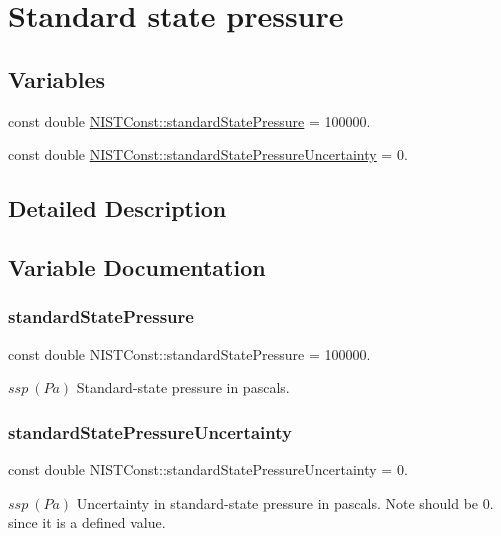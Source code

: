 \hypertarget{group___standard_state_pressure}{}\section{Standard state pressure}
\label{group___standard_state_pressure}
\subsection*{Variables}
\begin{DoxyCompactItemize}
\item 
const double \hyperlink{group___standard_state_pressure_gaede4b63db291cd6a839180595c7a191d}{N\+I\+S\+T\+Const\+::standard\+State\+Pressure} = 100000.
\item 
const double \hyperlink{group___standard_state_pressure_gad09c32ae21271794dece1e639699e96a}{N\+I\+S\+T\+Const\+::standard\+State\+Pressure\+Uncertainty} = 0.
\end{DoxyCompactItemize}


\subsection{Detailed Description}


\subsection{Variable Documentation}
\mbox{\label{group___standard_state_pressure_gaede4b63db291cd6a839180595c7a191d}} 
\subsubsection{\texorpdfstring{standard\+State\+Pressure}{standardStatePressure}}
{\footnotesize\ttfamily const double N\+I\+S\+T\+Const\+::standard\+State\+Pressure = 100000.}

$ssp \ (Pa)$ Standard-\/state pressure in pascals. \mbox{\label{group___standard_state_pressure_gad09c32ae21271794dece1e639699e96a}} 
\subsubsection{\texorpdfstring{standard\+State\+Pressure\+Uncertainty}{standardStatePressureUncertainty}}
{\footnotesize\ttfamily const double N\+I\+S\+T\+Const\+::standard\+State\+Pressure\+Uncertainty = 0.}

$ssp \ (Pa)$ Uncertainty in standard-\/state pressure in pascals. Note should be 0. since it is a defined value. 